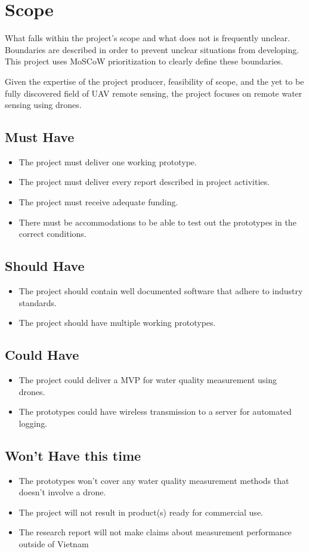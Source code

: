 \newpage
\section{Scope}
What falls within the project’s scope and what does not is frequently  unclear. Boundaries are described in order to prevent unclear situations from developing. This project uses \gls{MoSCoW} prioritization to clearly define these boundaries. \cite{moscow}

Given the expertise of the project producer, feasibility of scope, and the yet to be fully discovered field of \gls{UAV} remote sensing, the project focuses on remote water sensing using drones.

\subsection{Must Have}
\begin{itemize}
  \item The project must deliver one working prototype.
  \item The project must deliver every report described in project activities.
  \item The project must receive adequate funding.
  \item There must be accommodations to be able to test out the prototypes in the correct conditions.
\end{itemize}
\subsection{Should Have}
\begin{itemize}
  \item The project should contain well documented software that adhere to industry standards.
  \item The project should have multiple working prototypes.
\end{itemize}
\subsection{Could Have}
\begin{itemize}
  \item The project could deliver a \gls{MVP} for water quality measurement using drones.
  \item The prototypes could have wireless transmission to a server for automated logging.
\end{itemize}
\subsection{Won’t Have this time}
\begin{itemize}
  \item The prototypes won't cover any water quality measurement methods that doesn't involve a drone.
  \item The project will not result in product(s) ready for commercial use.
  \item The research report will not make claims about measurement performance outside of Vietnam
\end{itemize}